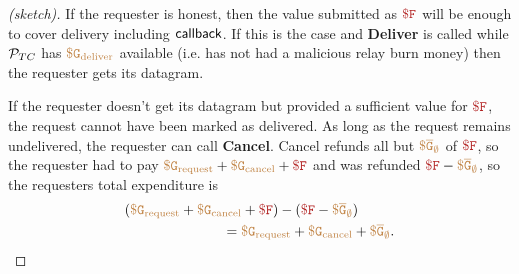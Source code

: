 \begin{proof}[(sketch)]
If the requester is honest, then the value submitted as $\fee$ will be enough to cover delivery including ${\sf callback}$.
If this is the case and {\bf Deliver} is called while ${\cal P}_{TC}$ has $\tt {\color{brown} \$G_\text{deliver} }$ available (i.e. has not had a malicious relay burn money)
then the requester gets its datagram.

If the requester doesn't get its datagram but provided a sufficient value for $\fee$, the request cannot have been marked as delivered.
As long as the request remains undelivered, the requester can call {\bf Cancel}.
Cancel refunds all but $\tt {\color{brown} \$\overline{G}_\emptyset }$ of $\fee$, so the requester had to pay $\gasrequest + \gascancel + \fee$ and was refunded $\fee - \constgascancel$, so the requesters total expenditure is
\begin{align*}
  (\gasrequest + \gascancel + \fee) - (\fee - \constgascancel& ) \\ = \gasrequest + \gascancel & + \constgascancel.
\end{align*}
\end{proof}



